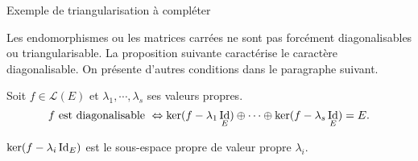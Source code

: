 Exemple de triangularisation  à compléter

Les endomorphismes ou les matrices carrées ne sont pas forcément diagonalisables ou triangularisable. La proposition suivante caractérise le caractère diagonalisable. On présente  d'autres conditions dans le paragraphe suivant. 
\begin{propn}\label{caracdiag}
  Soit $f\in \mathcal{L}(E)$ et $\lambda_1, \cdots ,\lambda_s$ ses valeurs propres.
\[
  f \text{ est diagonalisable } \Leftrightarrow \ker(f-\lambda_1 \mathop{\mathrm{Id}}_E) \oplus \cdots \oplus \ker(f-\lambda_s \mathop{\mathrm{Id}}_E) = E. 
\]
\end{propn}
\begin{defi}
  $\ker(f-\lambda_i \mathop{\mathrm{Id}}_E)$ est le sous-espace propre de valeur propre $\lambda_i$.
\end{defi}

